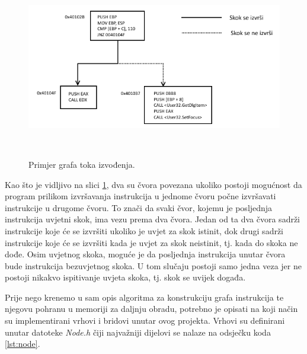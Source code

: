 \documentclass[times, utf8, diplomski, numeric]{fer}
\begin{document}
\begin{figure}[!htb]
\centering
\setlength\fboxsep{0pt}
\setlength\fboxrule{0.5pt}
\includegraphics[width=13cm, height=8cm]{slike/control_flow_graph}
\caption{Primjer grafa toka izvođenja.}
\label{fig:control_flow_graph} 
\end{figure}
Kao što je vidljivo na slici \ref{fig:control_flow_graph}, dva su čvora povezana ukoliko postoji mogućnost da program prilikom izvršavanja instrukcija u jednome čvoru počne izvršavati instrukcije u drugome čvoru. To znači da svaki čvor, kojemu je posljednja instrukcija uvjetni skok, ima vezu prema dva čvora. Jedan od ta dva čvora sadrži instrukcije koje će se izvršiti ukoliko je uvjet za skok istinit, dok drugi sadrži instrukcije koje će se izvršiti kada je uvjet za skok neistinit, tj. kada do skoka ne dođe. Osim uvjetnog skoka, moguće je da posljednja instrukcija unutar čvora bude instrukcija bezuvjetnog skoka. U tom slučaju postoji samo jedna veza jer ne postoji nikakvo ispitivanje uvjeta skoka, tj. skok se uvijek događa.

Prije nego krenemo u sam opis algoritma za konstrukciju grafa instrukcija te njegovu pohranu u memoriji za daljnju obradu, potrebno je opisati na koji način su implementirani vrhovi i bridovi unutar ovog projekta. Vrhovi su definirani unutar datoteke \emph{Node.h} čiji najvažniji dijelovi se nalaze na odsječku koda \ref{lst:node}. 
\end{document}
